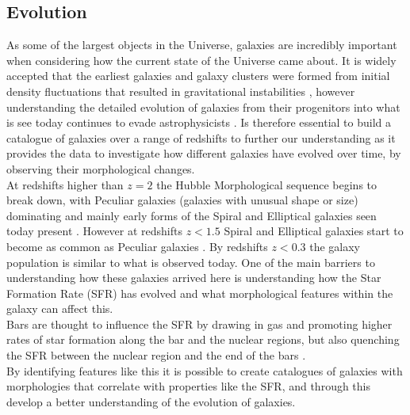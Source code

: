 \documentclass[12pt, onecolumn]{aa}
\begin{document}
\subsection{Evolution}\label{sec:evolution}
As some of the largest objects in the Universe, galaxies are incredibly important when considering how the current state of the Universe came about. It is widely accepted that the earliest galaxies and galaxy clusters were formed from initial density fluctuations that resulted in gravitational instabilities \citep{1998CotA}, however understanding the detailed evolution of galaxies from their progenitors into what is see today continues to evade astrophysicists \citep{2007arXiv0712.2865E}. Is therefore essential to build a catalogue of galaxies over a range of redshifts to further our understanding as it provides the data to investigate how different galaxies have evolved over time, by observing their morphological changes.\\

At redshifts higher than $z=2$ the Hubble Morphological sequence begins to break down, with Peculiar galaxies (galaxies with unusual shape or size) dominating and mainly early forms of the Spiral and Elliptical galaxies seen today present \citep{2011ARA&A..49..525S}. However at redshifts $z<1.5$ Spiral and Elliptical galaxies start to become as common as Peculiar galaxies \citep{2014ARA&A..52..291C}. By redshifts $z< 0.3$ the galaxy population is similar to what is observed today. One of the main barriers to understanding how these galaxies arrived here is understanding how the Star Formation Rate (SFR) has evolved and what morphological features within the galaxy can affect this.\\
Bars are thought to influence the SFR \citep{2014ARA&A..52..291C} by drawing in gas and promoting higher rates of star formation along the bar and the nuclear regions, but also quenching the SFR between the nuclear region and the end of the bars \citep{2019A&A...628A..24G}. \\

By identifying features like this it is possible to create catalogues of galaxies with morphologies that correlate with properties like the SFR, and through this develop a better understanding of the evolution of galaxies.
\end{document}
